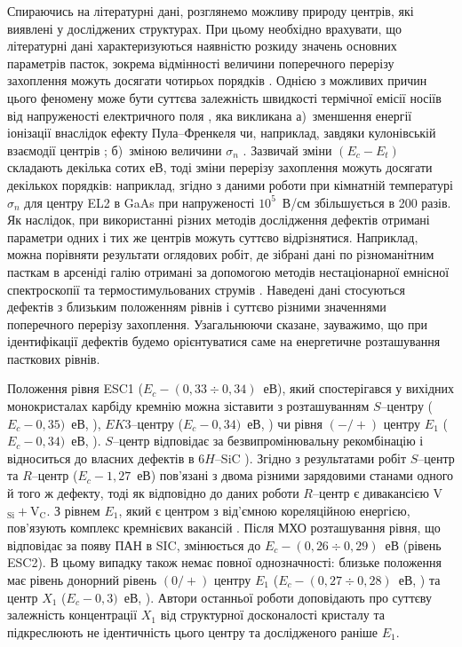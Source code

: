 Спираючись на літературні дані, розглянемо можливу природу центрів,
які виявлені у досліджених структурах.
При цьому необхідно врахувати, що літературні дані характеризуються наявністю розкиду значень основних параметрів
пасток, зокрема відмінності величини поперечного перерізу захоплення можуть досягати чотирьох порядків \cite{Pavlovic2000}.
Однією з можливих причин цього феномену може бути суттєва залежність швидкості термічної емісії носіїв від
напруженості електричного поля  \cite{Bulyarskii2000r,Makram,Shishiyanu},
яка викликана
а)~зменшення енергії іонізації внаслідок ефекту Пула--Френкеля чи, наприклад,
завдяки кулонівській взаємодії центрів \cite{Stellmacher};
б)~зміною величини $\sigma_n$ \cite{Shishiyanu,Bourgoin2001}.
Зазвичай зміни $(E_c-E_t)$ складають декілька сотих еВ, тоді
зміни перерізу захоплення можуть досягати декількох порядків:
наприклад, згідно з даними роботи \cite{Bourgoin2001}  при кімнатній температурі $\sigma_n$ для центру EL2 в GaAs при напруженості $10^5$~В/см збільшується в 200 разів.
Як наслідок, при використанні різних методів дослідження дефектів отримані параметри одних і тих же центрів
можуть суттєво відрізнятися.
Наприклад, можна порівняти результати оглядових робіт, де зібрані дані по різноманітним пасткам в арсеніді галію отримані за допомогою методів нестаціонарної емнісної спектроскопії \cite{Bourgoin:GaAs} та
термостимульованих струмів \cite{Pavlovic2000}.
Наведені дані стосуються дефектів з близьким положенням рівнів і суттєво різними значеннями поперечного перерізу захоплення.
Узагальнюючи сказане, зауважимо, що при ідентифікації дефектів будемо орієнтуватися саме на енергетичне розташування
пасткових рівнів.


Положення рівня ESC1 ($E_c-(0,33\div0,34)$~еВ), який спостерігався у вихідних монокристалах карбіду кремнію
можна зіставити з розташуванням $S$--центру ($E_c-0,35)$~еВ, \cite{Lebed1999,Anikin1991:2,Anikin1991:3}),
$EK3$--центру ($E_c-0,34)$~еВ, \cite{Kuznets1997}) чи рівня $(-/+)$ центру $E_1$ ($E_c-0,34)$~еВ, \cite{Lebed1999}).
$S$--центр відповідає за безвипромінювальну рекомбінацію і відноситься до власних дефектів в 6$H$--SiC \cite{Lebed1999}).
Згідно з результатами робіт \cite{Anikin1991:2,Anikin1991:3} $S$--центр та $R$--центр ($E_c-1,27$~еВ) пов'язані
з двома різними зарядовими станами одного й того ж дефекту, тоді як відповідно до даних роботи \cite{Lebedev2000}
$R$--центр є дивакансією V$_\text{Si}+$V$_\text{C}$.
З рівнем $E_1$, який є центром з від'ємною кореляційною енергією,
пов'язують комплекс кремнієвих вакансій  \cite{Lebedev2001}.
Після МХО розташування рівня, що відповідає за появу ПАН в SIC, змінюється до $E_c-(0,26\div0,29)$~еВ (рівень ESC2).
В цьому випадку також немає повної однозначності:
близьке положення має рівень донорний рівень $(0/+)$ центру $E_1$ ($E_c-(0,27\div0,28)$~еВ, \cite{Hemmingsson})
та центр $X_1$ ($E_c-0,3)$~еВ, \cite{Lebedev2001}).
Автори останньої роботи доповідають про суттєву залежність концентрації $X_1$ від структурної
досконалості кристалу та підкреслюють не ідентичність цього центру  та  дослідженого раніше $E_1$.

